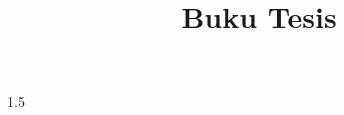 \documentclass[12pt, a4paper,twoside, bahasa]{report}
\title{Buku Tesis}
\begin{document}


\begin{spacing}{1.5}
	
	\cleardoublepage
	
	\cleardoublepage
	
	\cleardoublepage
	
	\cleardoublepage
	
	\cleardoublepage
\end{spacing}
\DaftarPustaka
\DaftarRiwayatHidup
\end{document}
